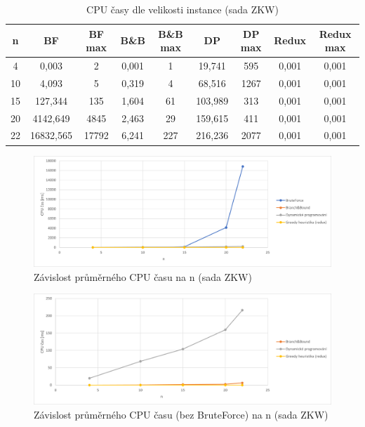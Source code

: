 \documentclass[12pt]{article}
\begin{document}
\begin{table}
    \begin{center}
         \begin{tabular}{|c | c | c | c| c | c | c | c | c|} 
         \hline
         n & BF & BF max & B\&B & B\&B max & DP & DP max & Redux & Redux max \\ [0.1ex] 
         \hline\hline
        4 & 0,003 & 2 & 0,001 & 1 & 19,741 & 595 & 0,001 & 0,001 \\
        \hline
        10 & 4,093 & 5 & 0,319 & 4 & 68,516 & 1267 & 0,001 & 0,001 \\
        \hline
        15 & 127,344 & 135 & 1,604 & 61 & 103,989 & 313 & 0,001 & 0,001 \\
        \hline
        20 & 4142,649 & 4845 & 2,463 & 29 & 159,615 & 411 & 0,001 & 0,001 \\
        \hline
        22 & 16832,565 & 17792 & 6,241 & 227 & 216,236 & 2077 & 0,001 & 0,001 \\
        \hline
        \end{tabular}
        \caption{CPU časy dle velikosti instance (sada ZKW)}
        \label{tab:zkw_cpu_times}
    \end{center}
\end{table}

\begin{figure}[ht]\centering
    \includegraphics[width=1\textwidth, keepaspectratio]{graphs/ZKW/times/zkw_cpu_time_avg.png}
    \caption{Závislost průměrného CPU času na n (sada ZKW)}
    \label{fig:zkw_cpu_time_avg}
\end{figure}

\begin{figure}[ht]\centering
    \includegraphics[width=1\textwidth, keepaspectratio]{graphs/ZKW/times/zkw_cpu_time_avg_without_brute_force.png}
    \caption{Závislost průměrného CPU času (bez BruteForce) na n (sada ZKW)}
    \label{fig:zkw_cpu_time_avg_without_brute_force}
\end{figure}
\end{document}

